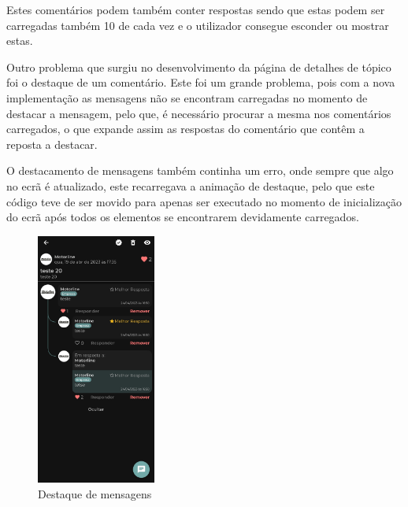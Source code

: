 Estes comentários podem também conter respostas sendo que estas podem ser carregadas também 10 de cada vez e o utilizador consegue esconder ou mostrar estas.

Outro problema que surgiu no desenvolvimento da página de detalhes de tópico foi o destaque de um comentário. Este foi um grande problema, pois com a nova implementação as mensagens não se encontram carregadas no momento de destacar a mensagem, pelo que, é necessário procurar a mesma nos comentários carregados, o que expande assim as respostas do comentário que contêm a reposta a destacar.

O destacamento de mensagens também continha um erro, onde sempre que algo no ecrã é atualizado, este recarregava a animação de destaque, pelo que este código teve de ser movido para apenas ser executado no momento de inicialização do ecrã após todos os elementos se encontrarem devidamente carregados.

\begin{figure}[htb]
  \centering
  \includegraphics[width=0.35\textwidth]{images/implementacao/frontend/forum/loading_topics/1686062701127.jpg}
  \caption{Destaque de mensagens}
  \label{fig:75}
\end{figure}